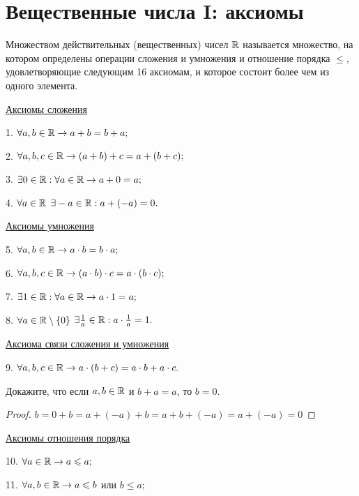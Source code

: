 	\section{Вещественные числа I: аксиомы}
	
	\begin{definition}
		Множеством действительных (вещественных) чисел $\mathbb R$ называется множество, на котором определены операции сложения и умножения и отношение порядка $\leqslant$, удовлетворяющие следующим 16 аксиомам, и которое состоит
		более чем из одного элемента.
	\end{definition}
	
	\underline{Аксиомы сложения}
	
	1. $\forall a, b \in \mathbb R \rightarrow a + b = b + a;$
	
	2. $\forall a, b, c \in \mathbb R \rightarrow (a + b) + c = a + (b + c);$
	
	3. $\exists 0 \in \mathbb R : \forall a \in \mathbb R \rightarrow a + 0 = a;$
	
	4. $\forall a \in \mathbb R$ $\exists -a \in \mathbb R : a + (-a) = 0.$
	
	\underline{Аксиомы умножения}
	
	5. $\forall a, b \in \mathbb R \rightarrow a \cdot b = b \cdot a;$
	
	6. $\forall a, b, c \in \mathbb R \rightarrow (a \cdot b) \cdot c = a \cdot (b \cdot c);$
	
	7. $\exists 1 \in \mathbb R : \forall a \in \mathbb R \rightarrow a \cdot 1 = a;$
	
	8. $\forall a \in \mathbb R \setminus \{0\}$ $\exists \frac{1}{a} \in \mathbb R : a \cdot \frac{1}{a} = 1.$
	
	\underline{Аксиома связи сложения и умножения}
	
	9. $\forall a, b, c \in \mathbb R \rightarrow a \cdot (b + c) = a \cdot b + a \cdot c.$
	
	\begin{example}
	    Докажите, что если $a, b \in \mathbb R$ и $b + a = a$, то $b = 0$.
	\end{example}
	
	\begin{proof}
		$b = 0 + b = a + (-a) + b = a + b + (-a) = a + (-a) = 0$
	\end{proof}
	
	\underline{Аксиомы отношения порядка}
	
	10. $\forall a \in \mathbb R \rightarrow a \leqslant a;$
	
	11. $\forall a, b \in \mathbb R \rightarrow a \leqslant b$ или $b \leqslant a;$
	
